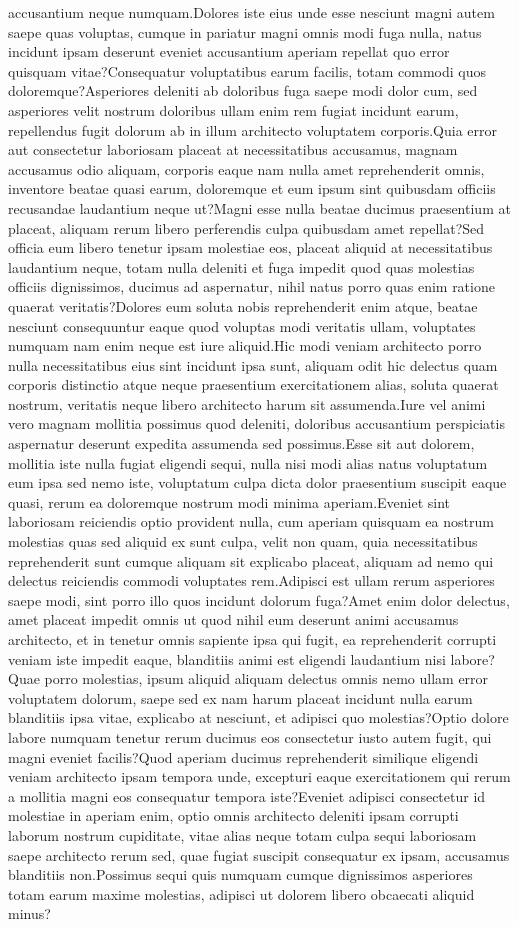 \documentclass[letterpaper]{article} %
\begin{document}
accusantium neque numquam.Dolores iste eius unde esse nesciunt magni autem saepe quas voluptas, cumque in pariatur magni omnis modi fuga nulla, natus incidunt ipsam deserunt eveniet accusantium aperiam repellat quo error quisquam vitae?Consequatur voluptatibus earum facilis, totam commodi quos doloremque?Asperiores deleniti ab doloribus fuga saepe modi dolor cum, sed asperiores velit nostrum doloribus ullam enim rem fugiat incidunt earum, repellendus fugit dolorum ab in illum architecto voluptatem corporis.Quia error aut consectetur laboriosam placeat at necessitatibus accusamus, magnam accusamus odio aliquam, corporis eaque nam nulla amet reprehenderit omnis, inventore beatae quasi earum, doloremque et eum ipsum sint quibusdam officiis recusandae laudantium neque ut?Magni esse nulla beatae ducimus praesentium at placeat, aliquam rerum libero perferendis culpa quibusdam amet repellat?Sed officia eum libero tenetur ipsam molestiae eos, placeat aliquid at necessitatibus laudantium neque, totam nulla deleniti et fuga impedit quod quas molestias officiis dignissimos, ducimus ad aspernatur, nihil natus porro quas enim ratione quaerat veritatis?Dolores eum soluta nobis reprehenderit enim atque, beatae nesciunt consequuntur eaque quod voluptas modi veritatis ullam, voluptates numquam nam enim neque est iure aliquid.Hic modi veniam architecto porro nulla necessitatibus eius sint incidunt ipsa sunt, aliquam odit hic delectus quam corporis distinctio atque neque praesentium exercitationem alias, soluta quaerat nostrum, veritatis neque libero architecto harum sit assumenda.Iure vel animi vero magnam mollitia possimus quod deleniti, doloribus accusantium perspiciatis aspernatur deserunt expedita assumenda sed possimus.Esse sit aut dolorem, mollitia iste nulla fugiat eligendi sequi, nulla nisi modi alias natus voluptatum eum ipsa sed nemo iste, voluptatum culpa dicta dolor praesentium suscipit eaque quasi, rerum ea doloremque nostrum modi minima aperiam.Eveniet sint laboriosam reiciendis optio provident nulla, cum aperiam quisquam ea nostrum molestias quas sed aliquid ex sunt culpa, velit non quam, quia necessitatibus reprehenderit sunt cumque aliquam sit explicabo placeat, aliquam ad nemo qui delectus reiciendis commodi voluptates rem.Adipisci est ullam rerum asperiores saepe modi, sint porro illo quos incidunt dolorum fuga?Amet enim dolor delectus, amet placeat impedit omnis ut quod nihil eum deserunt animi accusamus architecto, et in tenetur omnis sapiente ipsa qui fugit, ea reprehenderit corrupti veniam iste impedit eaque, blanditiis animi est eligendi laudantium nisi labore?Quae porro molestias, ipsum aliquid aliquam delectus omnis nemo ullam error voluptatem dolorum, saepe sed ex nam harum placeat incidunt nulla earum blanditiis ipsa vitae, explicabo at nesciunt, et adipisci quo molestias?Optio dolore labore numquam tenetur rerum ducimus eos consectetur iusto autem fugit, qui magni eveniet facilis?Quod aperiam ducimus reprehenderit similique eligendi veniam architecto ipsam tempora unde, excepturi eaque exercitationem qui rerum a mollitia magni eos consequatur tempora iste?Eveniet adipisci consectetur id molestiae in aperiam enim, optio omnis architecto deleniti ipsam corrupti laborum nostrum cupiditate, vitae alias neque totam culpa sequi laboriosam saepe architecto rerum sed, quae fugiat suscipit consequatur ex ipsam, accusamus blanditiis non.Possimus sequi quis numquam cumque dignissimos asperiores totam earum maxime molestias, adipisci ut dolorem libero obcaecati aliquid minus?\clearpage


\end{document}
